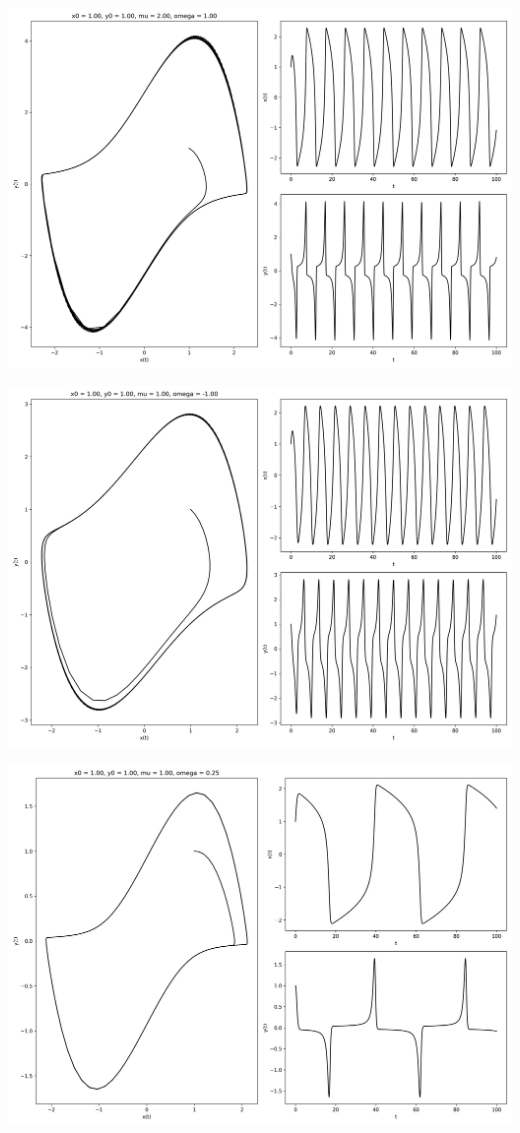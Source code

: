 \documentclass[12pt,a4paper]{jsarticle}
\makeatletter
\def\figcaption{\def\@captype{figure}\caption}
\makeatother
\begin{document}
\figcaption{$x_0=1.00, y_0=1.00, \mu=0.25, \omega=1.00$}
\includegraphics[draft, scale=0.33]{x1_0y1_0mu2_0omega1_0.png}
\figcaption{$x_0=1.00, y_0=1.00, \mu=2.00, \omega=1.00$}
\includegraphics[draft, scale=0.33]{x1_0y1_0mu1_0omega-1_0.png}
\figcaption{$x_0=1.00, y_0=1.00, \mu=1.00, \omega=-1.00$}
\includegraphics[draft, scale=0.33]{x1_0y1_0mu1_0omega0_2.png}
\end{document}
